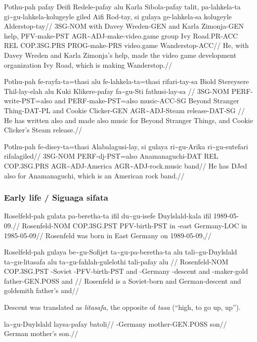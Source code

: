 \ex
\begingl
          \gla  Pothu-pah pafay Deifi Redele-pafay alu Karla Sibola-pafay talit, pa-lahkela-ta gi\~{}gu-lahkela-kolugeyle giled Aifi Rod-tay, si gulaya ge-lahkela-sa kolugeyle Alderstop-tay//
          \glb  3SG-NOM with Davey Wreden-GEN and Karla Zimonja-GEN help, PFV-make-PST AGR\~{}ADJ-make-video.game group Ivy Road.PR-ACC REL COP.3SG.PRS PROG-make-PRS video.game Wanderstop-ACC//
          \glft He, with Davey Wreden and Karla Zimonja's help, made the video game development organization Ivy Road, which is making Wanderstop.//
\endgl
\xe

\ex
\begingl
          \gla  Pothu-pah fe-rayfa-ta=thasi   alu fe-lahkela-ta=thasi rifari-tay-sa  Biold   Stereysere Thil-lay-elah alu Kuki   Klikere-pafay fa\~{}gu-Sti     fathusi-lay-sa  //
          \glb  3SG-NOM   PERF-write-PST=also and PERF-make-PST=also  music-ACC-SG   Beyond  Stranger   Thing-DAT-PL  and Cookie Clicker-GEN   AGR\~{}ADJ-Steam release-DAT-SG //
          \glft He has written also and made also music for Beyond Stranger Things, and Cookie Clicker's Steam release.//
\endgl
\xe

\ex
\begingl
          \gla  Pothu-pah fe-disey-ta=thasi Alabalagusi-lay, si  gulaya      ri\~{}gu-Arika     ri\~{}gu-sutefari     rifalagiled//
          \glb  3SG-NOM   PERF-dj-PST=also  Anamanaguchi-DAT REL COP.3SG.PRS AGR\~{}ADJ-America AGR\~{}ADJ-rock.music band//
          \glft He has DJed also for Anamanaguchi, which is an American rock band.//
\endgl
\xe

\newpage

\subsubsection*{Early life / Siguaga sifata}
\ex
\begingl
\gla  Roselfeld-pah gulata      pa-beretha-ta ifil du\~{}gu-isefe Duylslald-kala ifil 1989-05-09.//
\glb  Rosenfeld-NOM COP.3SG.PST PFV-birth-PST  in   \agradj{}-east Germany-LOC    in   1985-05-09//
\glft Rosenfeld was born in East Germany on 1989-05-09,//
\endgl
\xe

\ex
\begingl
\gla  Roselfeld-pah gulaya      be\~{}gu-Sofijet ta\~{}gu-pa-beretha-ta alu tali\~{}gu-Duylslald ta\~{}gu-litasafa alu ta\~{}gu-fahlah-gulelothi tali-pafay      alu //
\glb  Rosenfeld-NOM COP.3SG.PST \agradj{}-Soviet \agradj{}-PFV-birth-PST and \agradj{}-Germany   \agradj{}-descent and \agradj{}-maker-gold      father-GEN.POSS and //
\glft Rosenfeld is a Soviet-born and German-descent and goldsmith father's and//
\endgl 

Descent was translated as \textit{litasafa}, the opposite of \textit{tasa} (``high, to go up, up'').

\ex
\begingl
\gla  la\~{}gu-Duylslald laysa-pafay batoli//
\glb  \agradj{}-Germany  mother-GEN.POSS son//
\glft German mother's son.//
\endgl
